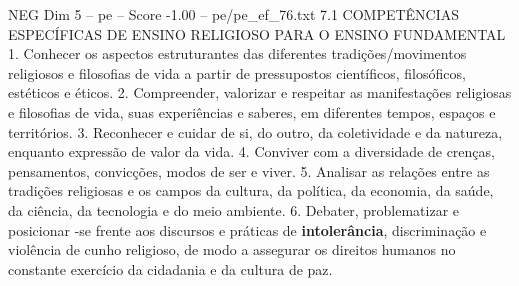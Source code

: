 \begin{textsample}{NEG Dim 5 – pe – Score -1.00 – pe/pe\_ef\_76.txt}  \label{ex:f5_neg_086}
7.1 COMPETÊNCIAS ESPECÍFICAS DE ENSINO RELIGIOSO PARA O ENSINO FUNDAMENTAL 1.
Conhecer os aspectos estruturantes das diferentes tradições/movimentos religiosos e filosofias de vida a partir de pressupostos científicos, filosóficos, estéticos e éticos. 2.
Compreender, valorizar e respeitar as manifestações religiosas e filosofias de vida, suas experiências e saberes, em diferentes tempos, espaços e territórios. 3.
Reconhecer e cuidar de si, do outro, da coletividade e da natureza, enquanto expressão de valor da vida. 4.
Conviver com a diversidade de crenças, pensamentos, convicções, modos de ser e viver. 5.
Analisar as relações entre as tradições religiosas e os campos da cultura, da política, da economia, da saúde, da ciência, da tecnologia e do meio ambiente. 6.
Debater, problematizar e posicionar -se frente aos discursos e práticas de \textbf{intolerância}, discriminação e violência de cunho religioso, de modo a assegurar os direitos humanos no constante exercício da cidadania e da cultura de paz.

\end{textsample}
